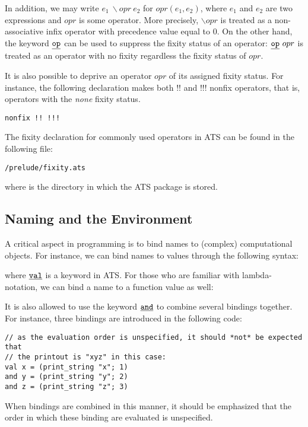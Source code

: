 In addition, we may write $e_1~\backslash opr~e_2$ for $opr(e_1, e_2)$,
where $e_1$ and $e_2$ are two expressions and $opr$ is some operator. More
precisely, $\backslash opr$ is treated as a non-associative infix operator
with precedence value equal to $0$.  On the other hand, the keyword $\underline{\texttt{op}}$
can be used to suppress the fixity status of an operator: $\underline{\texttt{op}}~opr$ is
treated as an operator with no fixity regardless the fixity status of
$opr$.

It is also possible to deprive an operator $opr$ of its assigned fixity
status. For instance, the following declaration makes both $!!$ and $!!!$
nonfix operators, that is, operators with the {\it none} fixity status.
\begin{verbatim}
nonfix !! !!!
\end{verbatim}
The fixity declaration for commonly used operators in ATS can be found
in the following file:
\begin{center}
\texttt{\ATSHOME/prelude/fixity.ats}
\end{center}
where \texttt{\ATSHOME} is the directory in which the ATS package is stored.

\subsection{Naming and the Environment}
A critical aspect in programming is to bind names to (complex)
computational objects. For instance, we can bind names to values through
the following syntax:

where $\underline{\texttt{val}}$ is a keyword in ATS.  For those who are familiar with
lambda-notation, we can bind a name to a function value as well:

It is also allowed to use the keyword $\underline{\texttt{and}}$ to combine several bindings
together. For instance, three bindings are introduced in the following
code:
\begin{verbatim}
// as the evaluation order is unspecified, it should *not* be expected that
// the printout is "xyz" in this case:
val x = (print_string "x"; 1)
and y = (print_string "y"; 2)
and z = (print_string "z"; 3)
\end{verbatim}
When bindings are combined in this manner, it should be emphasized that
the order in which these binding are evaluated is unspecified.



